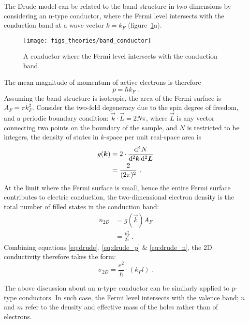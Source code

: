 The Drude model can be related to the band structure in two dimensions by considering an n-type conductor, where the Fermi level intersects with the conduction band at a wave vector $k = k_F$ (figure~\ref{fig:band_conductor}a). %
\begin{figure}[ht]%
    \centering%
    \texttt{[image: figs\_theories/band\_conductor]}%
    \caption[Band structure of an n-type conductor]{\label{fig:band_conductor}A conductor where the Fermi level intersects with the conduction band.}%
\end{figure}%
%
The mean magnitude of momentum of active electrons is therefore
\begin{equation}
    p = \hbar k_F~.\label{eq:drude_p}
\end{equation}%
Assuming the band structure is isotropic, the area of the Fermi surface is $A_F = \pi k_F^2$. Consider the two-fold degeneracy due to the spin degree of freedom, and a periodic boundary condition: $\vec{k} \cdot \vec{L} = 2N\pi$, where $\vec{L}$ is any vector connecting two points on the boundary of the sample, and $N$ is restricted to be integers, the density of states in $k$-space per unit real-space area is%
\begin{align}
    g(\vec{k}) &= 2\cdot\frac{\diff^4N}{\diff^2 \vec{k} \diff^2 \vec{L}}\nonumber\\
        & = \frac{2}{(2\pi)^2}~.
\end{align}%
At the limit where the Fermi surface is small, hence the entire Fermi surface contributes to electric conduction, the two-dimensional electron density is the total number of filled states in the conduction band:%
\begin{align}
    n_{2D} &= g(\vec{k}) A_F\nonumber\\
        &= \frac{k_F^2}{2\pi}~.\label{eq:drude_n}
\end{align}%
Combining equations \ref{eq:drude}, \ref{eq:drude_p} \& \ref{eq:drude_n}, the 2D conductivity therefore takes the form:
\begin{equation}
    \sigma_{2D} = \frac{e^2}{h} \cdot (k_F l)~.\label{eq:drude_2d}
\end{equation}%

The above discussion about an n-type conductor can be similarly applied to p-type conductors. In such case, the Fermi level intersects with the valence band; $n$ and $m$ refer to the density and effective mass of the holes rather than of electrons.

